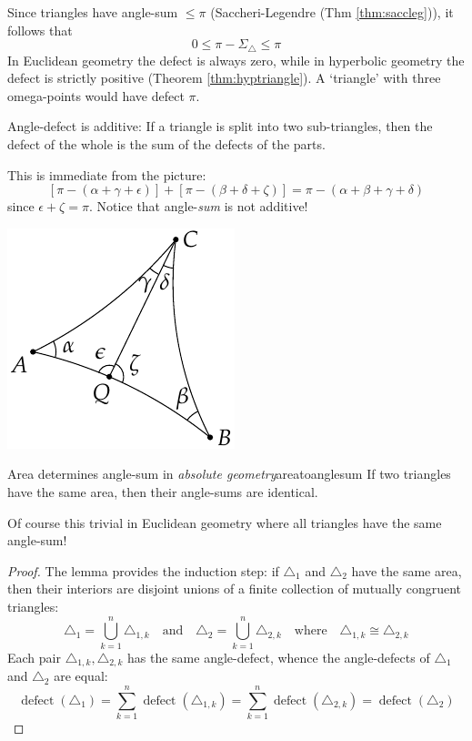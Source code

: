 Since triangles have angle-sum $\le\pi$ (Saccheri-Legendre (Thm \ref{thm:saccleg})), it follows that
\[0\le\pi-\Sigma_\triangle\le\pi\]
In Euclidean geometry the defect is always zero, while in hyperbolic geometry the defect is strictly positive (Theorem \ref{thm:hyptriangle}). A `triangle' with three omega-points would have defect $\pi$.

\begin{minipage}[t]{0.74\linewidth}\vspace{0pt}
\begin{lemm}{}{}
Angle-defect is additive: If a triangle is split into two sub-triangles, then the defect of the whole is the sum of the defects of the parts.
\end{lemm}

This is immediate from the picture:
\[\left[\pi-(\alpha+\gamma+\epsilon)\right]+\left[\pi-(\beta+\delta+\zeta)\right]=\pi-(\alpha+\beta+\gamma+\delta)\]
since $\epsilon+\zeta=\pi$. Notice that angle-\emph{sum} is not additive!
\end{minipage}\hfill\begin{minipage}[t]{0.25\linewidth}\vspace{-15pt}
\flushright\includegraphics{area-defect}
\end{minipage}



\begin{thm}{Area determines angle-sum in \emph{absolute geometry}}{areatoanglesum}
If two triangles have the same area, then their angle-sums are identical.
\end{thm}
Of course this trivial in Euclidean geometry where all triangles have the same angle-sum!


\begin{proof}
The lemma provides the induction step: if $\triangle_1$ and $\triangle_2$ have the same area, then their interiors are disjoint unions of a finite collection of mutually congruent triangles:
\[\triangle_1=\bigcup_{k=1}^n\triangle_{1,k}\quad\text{and}\quad \triangle_2=\bigcup_{k=1}^n\triangle_{2,k}\quad\text{where}\quad \triangle_{1,k}\cong\triangle_{2,k}\]
Each pair $\triangle_{1,k},\triangle_{2,k}$ has the same angle-defect, whence the angle-defects of $\triangle_1$ and $\triangle_2$ are equal:
\[\operatorname{defect}(\triangle_1)=\sum_{k=1}^n\operatorname{defect}(\triangle_{1,k}) =\sum_{k=1}^n\operatorname{defect}(\triangle_{2,k}) =\operatorname{defect}(\triangle_2)\tag*{\qedhere}\]
\end{proof}

